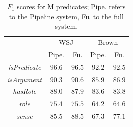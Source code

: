 \begin{table}[ht]

    \centering
    \begin{tabular}{|c|c|c|c|c|}\hline
      & \multicolumn{2}{c|}{WSJ} & \multicolumn{2}{c|}{Brown}\\
                                  & Pipe.  &  Fu.   & Pipe.  &  Fu. \\\hline 
        \emph{isPredicate}        & $96.6$ & $96.5$ & $92.2$ & $92.5$\\
        \emph{isArgument}         & $90.3$ & $90.6$ & $85.9$ & $86.9$ \\
        \emph{hasRole}            & $88.0$ & $87.9$ & $83.6$ & $83.8$ \\
        \emph{role}               & $75.4$ & $75.5$ & $64.2$ & $64.6$ \\
        \emph{sense}              & $85.5$ & $88.5$ & $67.3$ & $77.1$ \\\hline
    \end{tabular}
    \caption{$F_1$ scores for M predicates; Pipe. refers to the Pipeline system, Fu. to the full system.}
    \label{tbl:predicates}
\end{table}










